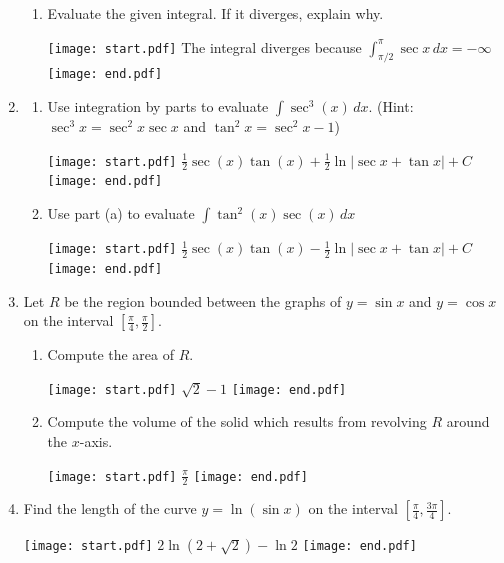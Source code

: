 \documentclass[12pt]{article}
\begin{document}
\begin{enumerate}
\begin{enumerate}
\item Evaluate the given integral.  If it diverges, explain why.

\texttt{[image: start.pdf]}
{{The integral diverges because $\int_{\pi/2}^{\pi} \sec{x} \,dx = -\infty$}}
\texttt{[image: end.pdf]}


\end{enumerate}

\item \begin{enumerate}

\item Use integration by parts to evaluate $\int \sec^{3}{(x)}\,dx$.  (Hint: $\sec^3{x}=\sec^2{x}\sec{x}$ and $\tan^2{x}=\sec^2{x}-1$)

\texttt{[image: start.pdf]}
{{$\frac{1}{2}\sec{(x)}\tan{(x)}+\frac{1}{2}\ln{|\sec{x}+\tan{x}|}+C$}}
\texttt{[image: end.pdf]}


\item Use part (a) to evaluate $\int \tan^{2}{(x)}\sec{(x)}\,dx$

\texttt{[image: start.pdf]}
{{$\frac{1}{2}\sec{(x)}\tan{(x)}-\frac{1}{2}\ln{|\sec{x}+\tan{x}|}+C$}}
\texttt{[image: end.pdf]}


\end{enumerate}

\item Let $R$ be the region bounded between the graphs of $y=\sin{x}$ and $y=\cos{x}$ on the interval $\left[\frac{\pi}{4},\frac{\pi}{2}\right]$.

\begin{enumerate}

\item Compute the area of $R$.

\texttt{[image: start.pdf]}
{{$\sqrt{2}-1$}}
\texttt{[image: end.pdf]}


\item Compute the volume of the solid which results from revolving $R$ around the $x$-axis.

\texttt{[image: start.pdf]}
{{$\frac{\pi}{2}$}}
\texttt{[image: end.pdf]}


\end{enumerate}

\item Find the length of the curve $y=\ln{(\sin{x})}$ on the interval $\left[\frac{\pi}{4},\frac{3\pi}{4}\right]$.

\texttt{[image: start.pdf]}
{{$2\ln{\left(2+\sqrt{2}\right)}-\ln{2}$}}
\texttt{[image: end.pdf]}


\end{enumerate}
\end{document}
